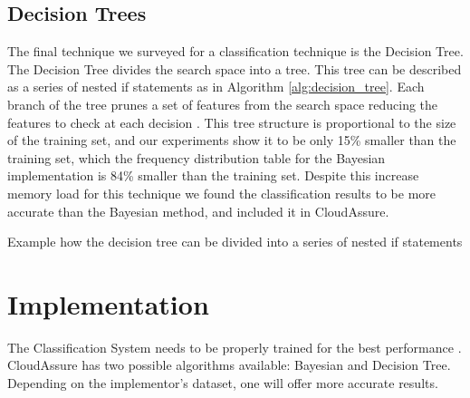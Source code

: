 \subsection{Decision Trees}
The final technique we surveyed for a classification technique is the Decision
Tree. The Decision Tree divides the search space into a tree. This tree can be
described as a series of nested if statements as in
Algorithm \ref{alg:decision_tree}. Each branch of the
tree prunes a set of features from the search space reducing the features to
check at each decision \autocite{Segaran2008}. This tree structure is
proportional to the size of the training set, and our experiments show it to be
only 15\% smaller than the training set, which the frequency distribution table
for the Bayesian implementation is 84\% smaller than the training set. Despite
this increase memory load for this technique we found the classification
results to be more accurate than the Bayesian method, and included it in
CloudAssure.

\begin{algorithm}
    \label{alg:decision_tree}
    \caption{Example how the decision tree can be divided into a series of
    nested if statements}
\begin{algorithmic}
                \EndIf
                \EndIf
                        \EndIf
                        \EndIf
                                \EndIf
                            \EndIf
                        \EndIf
                    \EndIf
                \EndIf
            \EndIf
        \EndIf
\end{algorithmic}
\end{algorithm}

\section{Implementation}
The Classification System
needs to be properly trained for the best performance \autocite{Russell2008}.
CloudAssure has two possible algorithms available: Bayesian and Decision Tree.
Depending on the implementor's dataset, one will offer more accurate results.

